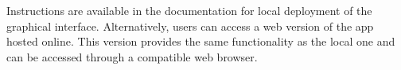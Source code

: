 \documentclass[main.tex]{subfiles}
\begin{document}
Instructions are available in the documentation for local deployment of the graphical interface.
Alternatively, users can access a web version of the app hosted online. This
version provides the same functionality as the local one and can be
accessed through a compatible web browser.\par
\begin{figure}[!h]
  \begin{minipage}{.5\linewidth}
    \centering
  \end{minipage}
  \begin{minipage}{.5\linewidth}
    \centering

\end{minipage}
\end{figure}
\end{document}
